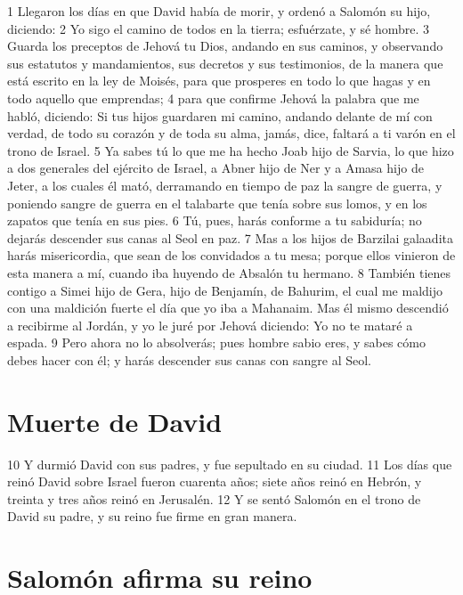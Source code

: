 1 Llegaron los días en que David había de morir, y ordenó a Salomón su hijo, diciendo:
2 Yo sigo el camino de todos en la tierra; esfuérzate, y sé hombre.
3 Guarda los preceptos de Jehová tu Dios, andando en sus caminos, y observando sus estatutos y mandamientos, sus decretos y sus testimonios, de la manera que está escrito en la ley de Moisés, para que prosperes en todo lo que hagas y en todo aquello que emprendas;
4 para que confirme Jehová la palabra que me habló, diciendo: Si tus hijos guardaren mi camino, andando delante de mí con verdad, de todo su corazón y de toda su alma, jamás, dice, faltará a ti varón en el trono de Israel.
5 Ya sabes tú lo que me ha hecho Joab hijo de Sarvia, lo que hizo a dos generales del ejército de Israel, a Abner hijo de Ner y a Amasa hijo de Jeter, a los cuales él mató, derramando en tiempo de paz la sangre de guerra, y poniendo sangre de guerra en el talabarte que tenía sobre sus lomos, y en los zapatos que tenía en sus pies.
6 Tú, pues, harás conforme a tu sabiduría; no dejarás descender sus canas al Seol en paz.
7 Mas a los hijos de Barzilai galaadita harás misericordia, que sean de los convidados a tu mesa; porque ellos vinieron de esta manera a mí, cuando iba huyendo de Absalón tu hermano.
8 También tienes contigo a Simei hijo de Gera, hijo de Benjamín, de Bahurim, el cual me maldijo con una maldición fuerte el día que yo iba a Mahanaim. Mas él mismo descendió a recibirme al Jordán, y yo le juré por Jehová diciendo: Yo no te mataré a espada. 
9 Pero ahora no lo absolverás; pues hombre sabio eres, y sabes cómo debes hacer con él; y harás descender sus canas con sangre al Seol.
\section*{Muerte de David}

 
10 Y durmió David con sus padres, y fue sepultado en su ciudad.
11 Los días que reinó David sobre Israel fueron cuarenta años; siete años reinó en Hebrón, y treinta y tres años reinó en Jerusalén. 
12 Y se sentó Salomón en el trono de David su padre, y su reino fue firme en gran manera.
\section*{Salomón afirma su reino}

